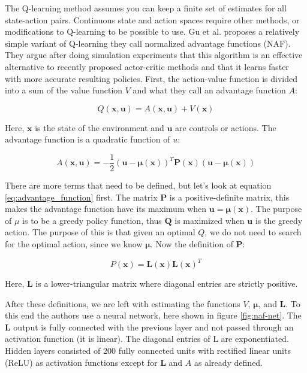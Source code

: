The Q-learning method assumes you can keep a finite set of estimates for all
state-action pairs. Continuous state and action spaces require other methods,
or modifications to Q-learning to be possible to use. Gu et al.
\cite{gu2016continuous} proposes a relatively simple variant of Q-learning they
call normalized advantage functions (NAF). They argue after doing simulation
experiments that this algorithm is an effective alternative to recently
proposed actor-critic methods and that it learns faster with more accurate
resulting policies. First, the action-value function is divided into a sum of
the value function $V$ and what they call an advantage function $A$:

\begin{equation}
    Q(\mathbf{x}, \mathbf{u}) = A(\mathbf{x}, \mathbf{u}) + V(\mathbf{x})
\end{equation}

Here, $\mathbf{x}$ is the state of the environment and $\mathbf{u}$ are
controls or actions. The advantage function is a quadratic function of $u$:

\begin{equation}
    A(\mathbf{x}, \mathbf{u}) = -\frac{1}{2}(\mathbf{u} - \mathbf{\mu(x)})^T\mathbf{P(x)}(\mathbf{u} - \mathbf{\mu(x)})
    \label{eq:advantage_function}
\end{equation}

There are more terms that need to be defined, but let's look at equation
\ref{eq:advantage_function} first. The matrix $\mathbf{P}$ is a
positive-definite matrix, this makes the advantage function have its maximum
when $\mathbf{u = \mu(x)}$.  The purpose of $\mu$ is to be a greedy policy
function, thus $\mathbf{Q}$ is maximized when $\mathbf{u}$ is the greedy
action. The purpose of this is that given an optimal $Q$, we do not need to
search for the optimal action, since we know $\mathbf{\mu}$. Now the definition
of $\mathbf{P}$:

\begin{equation}
    P(\mathbf{x}) = \mathbf{L(x)L(x)}^T
\end{equation}

Here, $\mathbf{L}$ is a lower-triangular matrix where diagonal entries are
strictly positive.

After these definitions, we are left with estimating the functions $V$,
$\mathbf{\mu}$, and $\mathbf{L}$. To this end the authors use a neural network,
here shown in figure \ref{fig:naf-net}. The $\mathbf{L}$ output is fully
connected with the previous layer and not passed through an activation function
(it is linear). The diagonal entries of L are exponentiated. Hidden layers
consisted of 200 fully connected units with rectified linear units (ReLU) as
activation functions except for $\mathbf{L}$ and $A$ as already defined.

